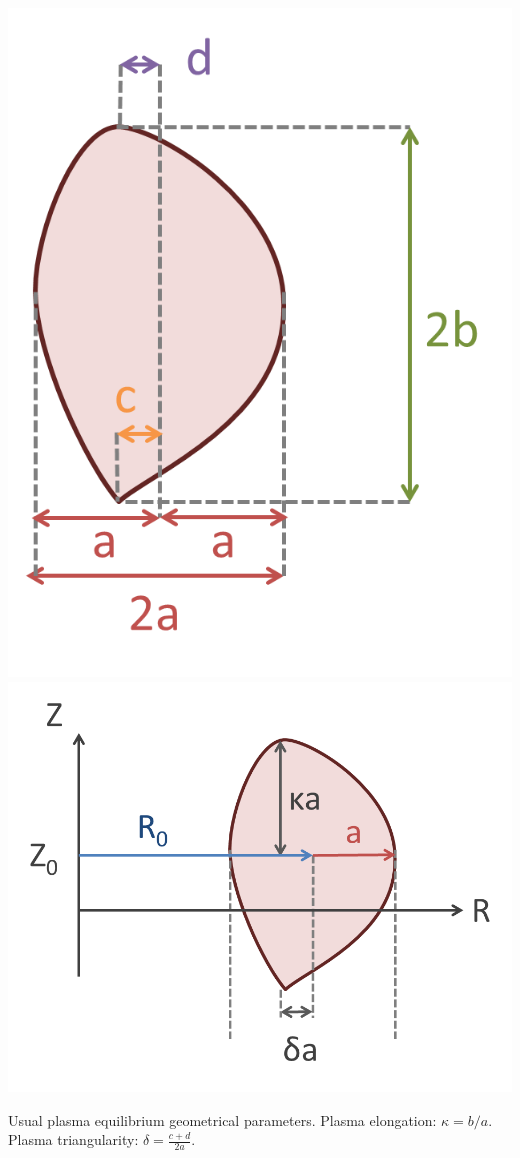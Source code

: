 \begin{marginfigure}
	\includegraphics[width=1\linewidth]{figures/Tokamak_equilibrium1}\\
    \includegraphics[width=1\linewidth]{figures/Tokamak_equilibrium2}
    \caption{Usual plasma equilibrium geometrical parameters. Plasma elongation: $\kappa=b/a$. Plasma triangularity: $\delta=\frac{c+d}{2a}$. }
	\label{fig:tokamakequilibrium_parameters}
\end{marginfigure}

